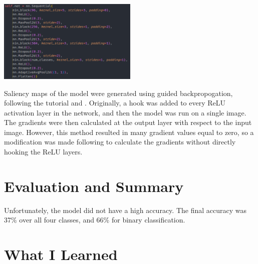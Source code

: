 \documentclass{article}[12pt]
\begin{document}
\begin{center}
    \includegraphics[width=0.5\textwidth]{images/model_code.png}
\end{center}

\indent
Saliency maps of the model were generated using guided backpropogation, following the tutorial \cite{saliency} and \cite{backprop}. Originally, a hook was added to every ReLU activation layer in the network, and then the model was run on a single image. The gradients were then calculated at the output layer with respect to the input image. However, this method resulted in many gradient values equal to zero, so a modification was made following \cite{saliency} to calculate the gradients without directly hooking the ReLU layers.\\

\section*{Evaluation and Summary}

Unfortunately, the model did not have a high accuracy. The final accuracy was 37\% over all four classes, and 66\% for binary classification.\\

\indent


\section*{What I Learned}
\end{document}
